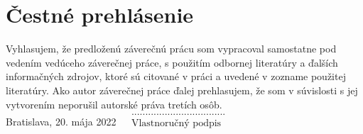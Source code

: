 \null
\vfill
\noindent
\section*{Čestné prehlásenie}

Vyhlasujem, že predloženú záverečnú prácu som vypracoval samostatne pod vedením vedúceho záverečnej práce, s použitím odbornej literatúry a ďalších informačných zdrojov, ktoré sú citované v práci a uvedené v zozname použitej literatúry. Ako autor záverečnej práce ďalej prehlasujem, že som v súvislosti s jej vytvorením neporušil autorské práva tretích osôb.\\

\noindent Bratislava, 20. mája 2022 \hfill $\begin{array}{rl}
	&\text{..................................}\\
	&\text{Vlastnoručný podpis}\\
\end{array}$
\cleardoublepage
